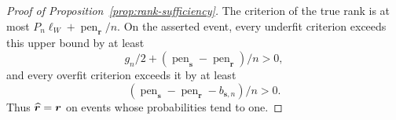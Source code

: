 \begin{proof}[Proof of Proposition~\ref{prop:rank-sufficiency}]
The criterion of the true rank is at most
\(P_n\ell_W+\operatorname{pen}_{\bm r}/n\). On the asserted event, every
underfit criterion exceeds this upper bound by at least
\[
g_n/2+(\operatorname{pen}_{\bm s}-
\operatorname{pen}_{\bm r})/n>0,
\]
and every overfit criterion exceeds it by at least
\[
(\operatorname{pen}_{\bm s}-\operatorname{pen}_{\bm r}
-b_{\bm s,n})/n>0.
\]
Thus \(\widehat{\bm r}=\bm r\) on events whose probabilities tend to one.
\end{proof}
